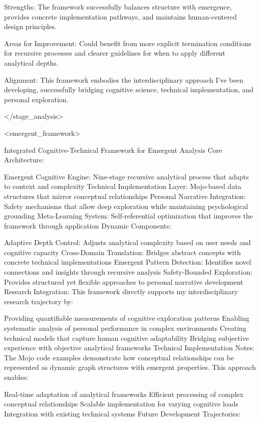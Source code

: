 {Strengths: The framework successfully balances structure with emergence, provides concrete implementation pathways, and maintains human-centered design principles.

Areas for Improvement: Could benefit from more explicit termination conditions for recursive processes and clearer guidelines for when to apply different analytical depths.

Alignment: This framework embodies the interdisciplinary approach I've been developing, successfully bridging cognitive science, technical implementation, and personal exploration.

</stage_analysis>

<emergent_framework>

Integrated Cognitive-Technical Framework for Emergent Analysis
Core Architecture:

Emergent Cognitive Engine: Nine-stage recursive analytical process that adapts to context and complexity
Technical Implementation Layer: Mojo-based data structures that mirror conceptual relationships
Personal Narrative Integration: Safety mechanisms that allow deep exploration while maintaining psychological grounding
Meta-Learning System: Self-referential optimization that improves the framework through application
Dynamic Components:

Adaptive Depth Control: Adjusts analytical complexity based on user needs and cognitive capacity
Cross-Domain Translation: Bridges abstract concepts with concrete technical implementations
Emergent Pattern Detection: Identifies novel connections and insights through recursive analysis
Safety-Bounded Exploration: Provides structured yet flexible approaches to personal narrative development
Research Integration: This framework directly supports my interdisciplinary research trajectory by:

Providing quantifiable measurements of cognitive exploration patterns
Enabling systematic analysis of personal performance in complex environments
Creating technical models that capture human cognitive adaptability
Bridging subjective experience with objective analytical frameworks
Technical Implementation Notes: The Mojo code examples demonstrate how conceptual relationships can be represented as dynamic graph structures with emergent properties. This approach enables:

Real-time adaptation of analytical frameworks
Efficient processing of complex conceptual relationships
Scalable implementation for varying cognitive loads
Integration with existing technical systems
Future Development Trajectories:

}
